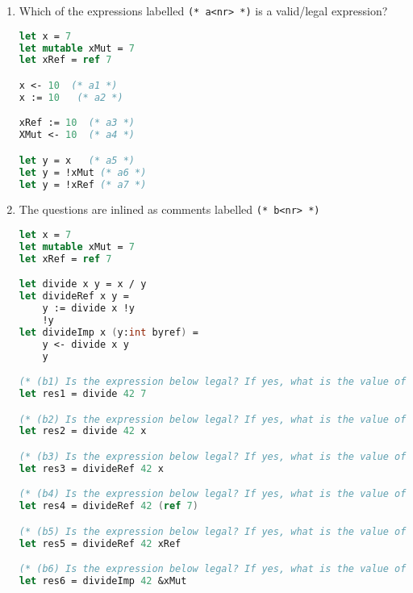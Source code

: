 \documentclass{article}
\begin{document}
\begin{enumerate}
\item Which of the expressions labelled \texttt{(* a<nr> *)} is a
  valid/legal expression?
\begin{lstlisting}[language=FSharp]
let x = 7
let mutable xMut = 7
let xRef = ref 7

x <- 10  (* a1 *)
x := 10   (* a2 *)

xRef := 10  (* a3 *)
XMut <- 10  (* a4 *)

let y = x   (* a5 *)
let y = !xMut (* a6 *)
let y = !xRef (* a7 *)
\end{lstlisting}


\item The questions are inlined as comments labelled \texttt{(* b<nr> *)} 
\begin{lstlisting}[language=FSharp]
let x = 7
let mutable xMut = 7
let xRef = ref 7

let divide x y = x / y
let divideRef x y = 
    y := divide x !y
    !y
let divideImp x (y:int byref) = 
    y <- divide x y
    y

(* (b1) Is the expression below legal? If yes, what is the value of res1, x, xMut, xRef afterwards? *)
let res1 = divide 42 7

(* (b2) Is the expression below legal? If yes, what is the value of res2, x, xMut, xRef afterwards? *)
let res2 = divide 42 x

(* (b3) Is the expression below legal? If yes, what is the value of res3, x, xMut, xRef afterwards? *)
let res3 = divideRef 42 x

(* (b4) Is the expression below legal? If yes, what is the value of res4, x, xMut, xRef afterwards? *)
let res4 = divideRef 42 (ref 7)

(* (b5) Is the expression below legal? If yes, what is the value of res5, x, xMut, xRef afterwards? *)
let res5 = divideRef 42 xRef

(* (b6) Is the expression below legal? If yes, what is the value of res6, x, xMut, xRef afterwards? *)
let res6 = divideImp 42 &xMut
\end{lstlisting}
\end{enumerate}
\end{document}
